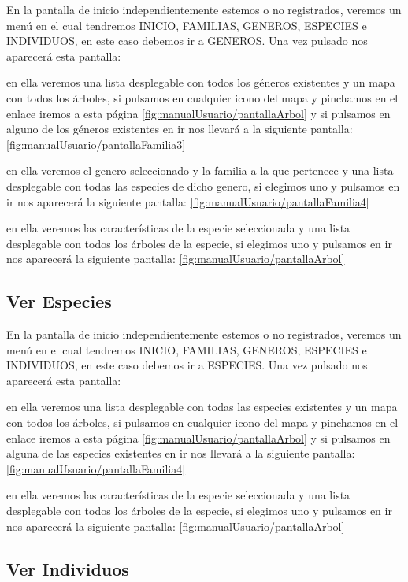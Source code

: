 En la pantalla de inicio independientemente estemos o no registrados, veremos un menú en el cual tendremos INICIO, FAMILIAS, GENEROS, ESPECIES e INDIVIDUOS, en este caso debemos ir a GENEROS. Una vez pulsado nos aparecerá esta pantalla: 

en ella veremos una lista desplegable con todos los géneros existentes y un mapa con todos los árboles, si pulsamos en cualquier icono del mapa y pinchamos en el enlace iremos a esta página \ref{fig:manualUsuario/pantallaArbol} y si pulsamos en alguno de los géneros existentes en ir nos llevará a la siguiente pantalla: \ref{fig:manualUsuario/pantallaFamilia3}

en ella veremos el genero seleccionado y la familia a la que pertenece y una lista desplegable con todas las especies de dicho genero, si elegimos uno y pulsamos en ir nos aparecerá la siguiente pantalla: \ref{fig:manualUsuario/pantallaFamilia4}

en ella veremos las características de la especie seleccionada y una lista desplegable con todos los árboles de la especie, si elegimos uno y pulsamos en ir nos aparecerá la siguiente pantalla: \ref{fig:manualUsuario/pantallaArbol}

\subsection{Ver Especies}

En la pantalla de inicio independientemente estemos o no registrados, veremos un menú en el cual tendremos INICIO, FAMILIAS, GENEROS, ESPECIES e INDIVIDUOS, en este caso debemos ir a ESPECIES. Una vez pulsado nos aparecerá esta pantalla: 

en ella veremos una lista desplegable con todas las especies existentes y un mapa con todos los árboles, si pulsamos en cualquier icono del mapa y pinchamos en el enlace iremos a esta página \ref{fig:manualUsuario/pantallaArbol} y si pulsamos en alguna de las especies existentes en ir nos llevará a la siguiente pantalla: \ref{fig:manualUsuario/pantallaFamilia4}

en ella veremos las características de la especie seleccionada y una lista desplegable con todos los árboles de la especie, si elegimos uno y pulsamos en ir nos aparecerá la siguiente pantalla: \ref{fig:manualUsuario/pantallaArbol}

\subsection{Ver Individuos}

